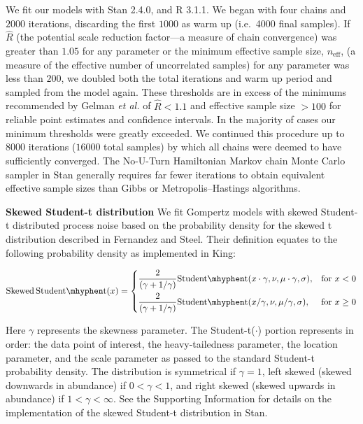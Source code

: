 We fit our models with Stan 2.4.0\cite{stan-manual2014}, and R 3.1.1\cite{r2014}. We began with four chains and \(2000\) iterations, discarding the first \(1000\) as warm up (i.e.~4000 final samples). If \(\hat{R}\) (the potential scale reduction factor---a measure of chain convergence) was greater than \(1.05\) for any parameter or the minimum effective sample size, \(n_\mathrm{eff}\), (a measure of the effective number of uncorrelated samples) for any parameter was less than \(200\), we doubled both the total iterations and warm up period and sampled from the model again. These thresholds are in excess of the minimums recommended by Gelman \emph{et al.}\cite{gelman2006a} of \(\hat{R} < 1.1\) and effective sample size \(> 100\) for reliable point estimates and confidence intervals. In the majority of cases our minimum thresholds were greatly exceeded. We continued this procedure up to \(8000\) iterations (\(16000\) total samples) by which all chains were deemed to have sufficiently converged. The No-U-Turn Hamiltonian Markov chain Monte Carlo sampler in Stan generally requires far fewer iterations to obtain equivalent effective sample sizes than Gibbs or Metropolis--Hastings algorithms\cite{stan-manual2014}.

\textbf{Skewed Student-t distribution} We fit Gompertz models with skewed Student-t distributed process noise based on the probability density for the skewed t distribution described in Fernandez and Steel\cite{fernandez1998}. Their definition equates to the following probability density as implemented in King\cite{king2012}:

\begin{equation}
  \mathrm{Skewed\,Student\mhyphen t}(x) =
\begin{dcases}
\frac{2}{(\gamma + 1/\gamma)}
         \mathrm{Student\mhyphen t}(x \cdot \gamma, \nu, \mu \cdot \gamma, \sigma),& \text{for } x < 0\\
       \frac{2}{(\gamma + 1/\gamma)}
         \mathrm{Student\mhyphen t}(x / \gamma, \nu, \mu / \gamma, \sigma),& \text{for } x \ge 0
\end{dcases}
\end{equation}

Here \(\gamma\) represents the skewness parameter. The Student-t(\(\cdot\)) portion represents in order: the data point of interest, the heavy-tailedness parameter, the location parameter, and the scale parameter as passed to the standard Student-t probability density. The distribution is symmetrical if \(\gamma = 1\), left skewed (skewed downwards in abundance) if \(0 < \gamma < 1\), and right skewed (skewed upwards in abundance) if \(1 < \gamma < \infty\). See the Supporting Information for details on the implementation of the skewed Student-t distribution in Stan.

